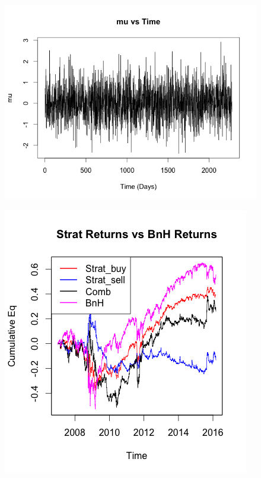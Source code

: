 \documentclass[12pt]{article}
\theoremstyle{definition}
\begin{document}
\begin{figure}[H]
\centering
\begin{minipage}{0.5\textwidth}
  \centering
  \includegraphics[width=1\textwidth]{ts1}
  \label{fig:test1}
\end{minipage}
\begin{minipage}{0.5\textwidth}
  \centering
  \includegraphics[scale=0.38]{ts2}
  \label{fig:test2}
\end{minipage}
\end{figure}
\end{document}

